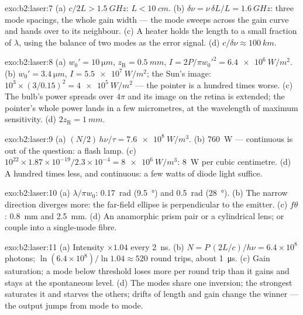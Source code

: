 \begin{solution}{exo:b2:laser:7}
(a) $c/2L > \qty{1.5}{GHz}$: $L < \qty{10}{cm}$. (b) $\delta\nu = \nu\,\delta L/L
= \qty{1.6}{GHz}$: three mode spacings, the whole gain width --- the mode
sweeps across the gain curve and hands over to its neighbour. (c) A
heater holds the length to a small fraction of $\lambda$, using the
balance of two modes as the error signal. (d) $c/\delta\nu \approx
\qty{100}{km}$.
\end{solution}

\begin{solution}{exo:b2:laser:8}
(a) $w_0' = \qty{10}{\micro m}$, $z_{\text{R}} = \qty{0.5}{mm}$, $I = 2P/\pi
w_0'^2 = \qty{6.4e6}{W/m^2}$. (b) $w_0' = \qty{3.4}{\micro m}$, $I =
\qty{5.5e7}{W/m^2}$; the Sun's image: $10^3 \times (3/0.15)^2 =
\qty{4e5}{W/m^2}$ --- the pointer is a hundred times worse. (c) The bulb's
power spreads over $4\pi$ and its image on the retina is extended; the
pointer's whole power lands in a few micrometres, at the wavelength
of maximum sensitivity. (d) $2z_{\text{R}} = \qty{1}{mm}$.
\end{solution}

\begin{solution}{exo:b2:laser:9}
(a) $(N/2)\,h\nu/\tau = \qty{7.6e8}{W/m^3}$. (b) \qty{760}{W} --- continuous
is out of the question: a flash lamp. (c) $10^{22} \times 1.87 \times
10^{-19}/2.3 \times 10^{-4} = \qty{8e6}{W/m^3}$: \qty{8}{W} per cubic
centimetre. (d) A hundred times less, and continuous: a few watts of
diode light suffice.
\end{solution}

\begin{solution}{exo:b2:laser:10}
(a) $\lambda/\pi w_0$: \qty{0.17}{rad} (\qty{9.5}{\degree}) and \qty{0.5}{rad}
(\qty{28}{\degree}). (b) The narrow direction diverges more: the
far-field ellipse is perpendicular to the emitter. (c) $f\theta$:
\qty{0.8}{mm} and \qty{2.5}{mm}. (d) An anamorphic prism pair or a
cylindrical lens; or couple into a single-mode fibre.
\end{solution}

\begin{solution}{exo:b2:laser:11}
(a) Intensity $\times 1.04$ every \qty{2}{ns}. (b) $N = P\,(2L/c)/h\nu =
6.4 \times 10^8$ photons; $\ln(6.4 \times 10^8)/\ln 1.04 \approx 520$ round
trips, about \qty{1}{\micro s}. (c) Gain saturation; a mode below
threshold loses more per round trip than it gains and stays at the
spontaneous level. (d) The modes share one inversion; the strongest
saturates it and starves the others; drifts of length and gain change
the winner --- the output jumps from mode to mode.
\end{solution}

